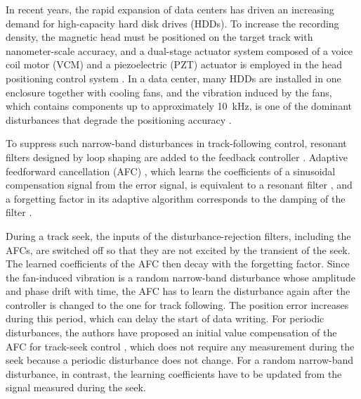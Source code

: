 \documentclass[conference]{IEEEtran}
\begin{document}
In recent years, the rapid expansion of data centers has driven an increasing
demand for high-capacity hard disk drives (HDDs). To increase the recording
density, the magnetic head must be positioned on the target track with
nanometer-scale accuracy, and a dual-stage actuator system composed of a voice
coil motor (VCM) and a piezoelectric (PZT) actuator is employed in the head
positioning control system \cite{yabui2023jvc,atsumi2024}. In a data center,
many HDDs are installed in one enclosure together with cooling fans, and the
vibration induced by the fans, which contains components up to approximately
10~kHz, is one of the dominant disturbances that degrade the positioning
accuracy \cite{eguchi2009,eguchi2017,yabui2022}.

To suppress such narrow-band disturbances in track-following control,
resonant filters designed by loop shaping are added to the feedback controller
\cite{atsumi2007,atsumi2026amc}. Adaptive feedforward cancellation (AFC)
\cite{sacks1993,bodson1994}, which learns the coefficients of a sinusoidal
compensation signal from the error signal, is equivalent to a resonant filter
\cite{messner1995}, and a forgetting factor in its adaptive algorithm
corresponds to the damping of the filter \cite{yabui2013}.

During a track seek, the inputs of the disturbance-rejection filters,
including the AFCs, are switched off so that they are not excited by the
transient of the seek. The learned coefficients of
the AFC then decay with the forgetting factor. Since the fan-induced vibration
is a random narrow-band disturbance whose amplitude and phase drift with time,
the AFC has to learn the disturbance again after the controller is changed to
the one for track following. The position error increases during this period,
which can delay the start of data writing. For periodic disturbances, the authors
have proposed an initial value compensation of the AFC for track-seek control
\cite{yabui2025ivc}, which does not require any measurement during the seek
because a periodic disturbance does not change. For a random narrow-band
disturbance, in contrast, the learning coefficients have to be updated from the
signal measured during the seek.
\end{document}

